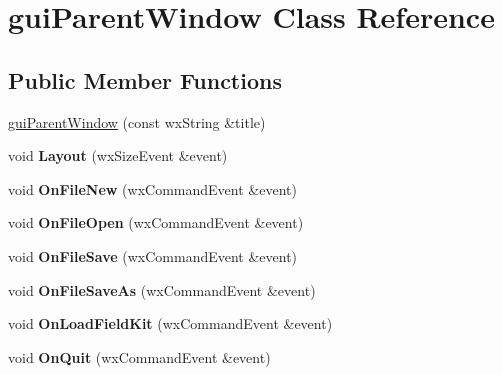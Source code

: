 \hypertarget{classgui_parent_window}{
\section{guiParentWindow Class Reference}
\label{classgui_parent_window}
}
\subsection*{Public Member Functions}
\begin{DoxyCompactItemize}
\item 
\hyperlink{classgui_parent_window_a665e8aa86c3245a4c12009a4be92e2dd}{guiParentWindow} (const wxString \&title)
\item 
\hypertarget{classgui_parent_window_ae1c105469172c21bc522117600202d8e}{
void {\bfseries Layout} (wxSizeEvent \&event)}
\label{classgui_parent_window_ae1c105469172c21bc522117600202d8e}

\item 
\hypertarget{classgui_parent_window_a6531451ac1c05b29f554cc621a10ab34}{
void {\bfseries OnFileNew} (wxCommandEvent \&event)}
\label{classgui_parent_window_a6531451ac1c05b29f554cc621a10ab34}

\item 
\hypertarget{classgui_parent_window_a04ef03dd324e0f84d51405601d7b6884}{
void {\bfseries OnFileOpen} (wxCommandEvent \&event)}
\label{classgui_parent_window_a04ef03dd324e0f84d51405601d7b6884}

\item 
\hypertarget{classgui_parent_window_a9002fc8401923778fcd50f7dacf7a3ca}{
void {\bfseries OnFileSave} (wxCommandEvent \&event)}
\label{classgui_parent_window_a9002fc8401923778fcd50f7dacf7a3ca}

\item 
\hypertarget{classgui_parent_window_a8564a01ee08fd2cda163d14e2f45576c}{
void {\bfseries OnFileSaveAs} (wxCommandEvent \&event)}
\label{classgui_parent_window_a8564a01ee08fd2cda163d14e2f45576c}

\item 
\hypertarget{classgui_parent_window_aeede3ba4afe16ea16877427b31668e84}{
void {\bfseries OnLoadFieldKit} (wxCommandEvent \&event)}
\label{classgui_parent_window_aeede3ba4afe16ea16877427b31668e84}

\item 
\hypertarget{classgui_parent_window_ac36badda89af0b39ee7b0d53150ef8fb}{
void {\bfseries OnQuit} (wxCommandEvent \&event)}
\label{classgui_parent_window_ac36badda89af0b39ee7b0d53150ef8fb}


\end{DoxyCompactItemize}
